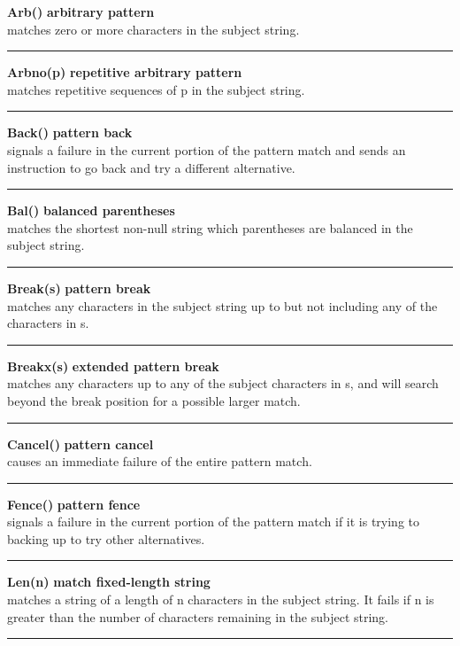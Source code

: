 \documentclass{article}
\begin{document}
\noindent\textbf{Arb()} \hfill\textbf{arbitrary pattern}\\
matches zero or more characters in the subject string.\\
\noindent\rule{14cm}{0.1pt}

\noindent\textbf{Arbno(p)} \hfill\textbf{repetitive arbitrary pattern}\\
matches repetitive sequences of p in the subject string.\\
\noindent\rule{14cm}{0.1pt}

\noindent\textbf{Back()} \hfill\textbf{pattern back}\\
signals a failure in the current portion of the pattern match and sends an instruction to go back and try a different alternative.\\
\noindent\rule{14cm}{0.1pt}

\noindent\textbf{Bal()} \hfill\textbf{balanced parentheses}\\
matches the shortest non-null string which parentheses are balanced in the subject string.\\
\noindent\rule{14cm}{0.1pt}

\noindent\textbf{Break(s)} \hfill\textbf{pattern break}\\
matches any characters in the subject string up to but not including any of the characters in s.\\
\noindent\rule{14cm}{0.1pt}

\noindent\textbf{Breakx(s)} \hfill\textbf{extended pattern break}\\
matches any characters up to any of the subject characters in s, and will search beyond the break position for a possible larger match.\\
\noindent\rule{14cm}{0.1pt}

\noindent\textbf{Cancel()} \hfill\textbf{pattern cancel}\\
causes an immediate failure of the entire pattern match.\\
\noindent\rule{14cm}{0.1pt}

\noindent\textbf{Fence()} \hfill\textbf{pattern fence}\\
signals a failure in the current portion of the pattern match if it is trying to backing up to try other alternatives.\\
\noindent\rule{14cm}{0.1pt}

\noindent\textbf{Len(n)} \hfill\textbf{match fixed-length string}\\
matches a string of a length of n characters in the subject string.  It fails if n is greater than the number of characters remaining in the subject string.\\
\noindent\rule{14cm}{0.1pt}
\end{document}
